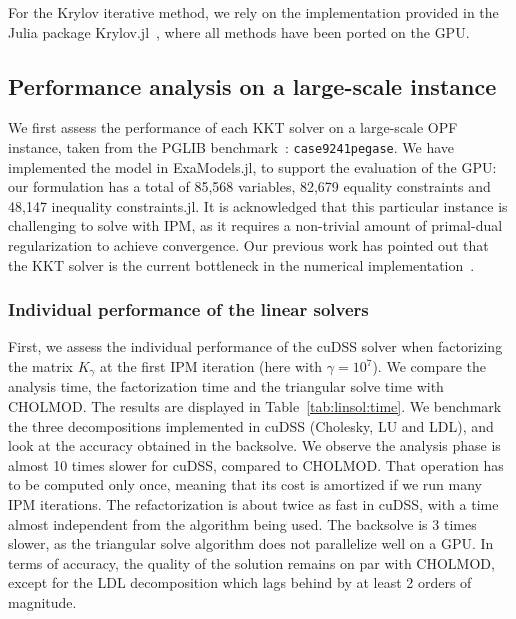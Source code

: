 For the Krylov iterative method, we rely on the implementation
provided in the Julia package Krylov.jl~\cite{montoison2023krylov},
where all methods have been ported on the GPU.


\subsection{Performance analysis on a large-scale instance}
We first assess the performance of each KKT solver
on a large-scale OPF instance, taken from
the PGLIB benchmark~\cite{babaeinejadsarookolaee2019power}: {\tt case9241pegase}.
We have implemented the model in ExaModels.jl, to support
the evaluation of the GPU: our formulation has
a total of 85,568 variables, 82,679 equality constraints and 48,147
inequality constraints.jl.
It is acknowledged that this particular instance is challenging to solve
with IPM, as it requires a non-trivial amount of primal-dual regularization
to achieve convergence.
Our previous work has pointed out that the KKT solver is the current bottleneck
in the numerical implementation~\cite{shin2023accelerating}.

\subsubsection{Individual performance of the linear solvers}
First, we assess the individual performance of the cuDSS solver when factorizing
the matrix $K_\gamma$ at the first IPM iteration (here with $\gamma = 10^7$).
We compare the analysis
time, the factorization time and the triangular solve time with CHOLMOD.
The results are displayed in Table~\ref{tab:linsol:time}. We benchmark the
three decompositions implemented in cuDSS (Cholesky, LU and LDL), and look at
the accuracy obtained in the backsolve. We observe the analysis phase
is almost 10 times slower for cuDSS, compared to CHOLMOD. That operation
has to be computed only once, meaning that its cost is amortized if we run
many IPM iterations. The refactorization is about twice as fast in cuDSS,
with a time almost independent from the algorithm being used. The backsolve
is 3 times slower, as the triangular solve algorithm does not parallelize
well on a GPU. In terms of accuracy, the quality of the solution remains on
par with CHOLMOD, except for the LDL decomposition which lags behind by at least
2 orders of magnitude.


